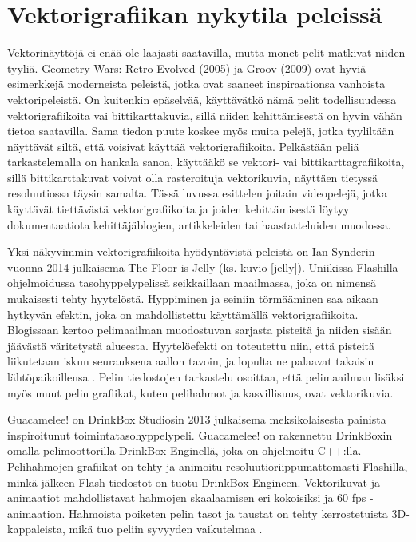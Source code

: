 \documentclass[utf8,bachelor]{gradu3}
\begin{document}
\section{Vektorigrafiikan nykytila peleissä}\label{nykypelit}


Vektorinäyttöjä ei enää ole laajasti saatavilla, mutta monet pelit matkivat niiden tyyliä. Geometry Wars: Retro Evolved (2005) ja Groov (2009) ovat hyviä esimerkkejä moderneista peleistä, jotka ovat saaneet inspiraationsa vanhoista vektoripeleistä. \parencite{RefWorks:doc:5be15b13e4b05b9281959f24} On kuitenkin epäselvää, käyttävätkö nämä pelit todellisuudessa vektorigrafiikoita vai bittikarttakuvia, sillä niiden kehittämisestä on hyvin vähän tietoa saatavilla. Sama tiedon puute koskee myös muita pelejä, jotka tyyliltään näyttävät siltä, että voisivat käyttää vektorigrafiikoita. Pelkästään peliä tarkastelemalla on hankala sanoa, käyttääkö se vektori- vai bittikarttagrafiikoita, sillä bittikarttakuvat voivat olla rasteroituja vektorikuvia, näyttäen tietyssä resoluutiossa täysin samalta. Tässä luvussa esittelen joitain videopelejä, jotka käyttävät tiettävästä vektorigrafiikoita ja joiden kehittämisestä löytyy dokumentaatiota kehittäjäblogien, artikkeleiden tai haastatteluiden muodossa.

Yksi näkyvimmin vektorigrafiikoita hyödyntävistä peleistä on Ian Synderin vuonna 2014 julkaisema The Floor is Jelly (ks. kuvio \ref{jelly}). Uniikissa Flashilla ohjelmoidussa tasohyppelypelissä seikkaillaan maailmassa, joka on nimensä mukaisesti tehty hyytelöstä. Hyppiminen ja seiniin törmääminen saa aikaan hytkyvän efektin, joka on mahdollistettu käyttämällä vektorigrafiikoita. \parencite{RefWorks:doc:5beea20ce4b06f8a51cf9f11} Blogissaan \textcite{RefWorks:doc:5beec035e4b0463eaf2fd475} kertoo pelimaailman muodostuvan sarjasta pisteitä ja niiden sisään jäävästä väritetystä alueesta. Hyytelöefekti on toteutettu niin, että pisteitä liikutetaan iskun seurauksena aallon tavoin, ja lopulta ne palaavat takaisin lähtöpaikoillensa \parencite{RefWorks:doc:5beec035e4b0463eaf2fd475}. Pelin \parencite{RefWorks:doc:5beea20ce4b06f8a51cf9f11} tiedostojen tarkastelu osoittaa, että pelimaailman lisäksi myös muut pelin grafiikat, kuten pelihahmot ja kasvillisuus, ovat vektorikuvia.

Guacamelee! on DrinkBox Studiosin 2013 julkaisema meksikolaisesta painista inspiroitunut toimintatasohyppelypeli. Guacamelee! on rakennettu DrinkBoxin omalla pelimoottorilla DrinkBox Enginellä, joka on ohjelmoitu C++:lla. Pelihahmojen grafiikat on tehty ja animoitu resoluutioriippumattomasti Flashilla, minkä jälkeen Flash-tiedostot on tuotu DrinkBox Engineen. Vektorikuvat ja -animaatiot mahdollistavat hahmojen skaalaamisen eri kokoisiksi ja 60 fps -animaation. \parencite{RefWorks:doc:5bdc818be4b0965708b5a0f0} Hahmoista poiketen pelin tasot ja taustat on tehty kerrostetuista 3D-kappaleista, mikä tuo peliin syvyyden vaikutelmaa \parencite{RefWorks:doc:5beef606e4b03977dc5d4788}.
\end{document}
